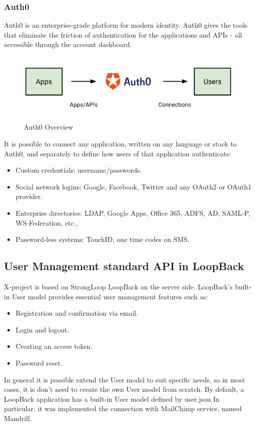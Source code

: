 \subsubsection{Auth0}

Auth0 is an enterprise-grade platform for modern identity.
Auth0 gives the tools that eliminate the friction of authentication for the applications and APIs - all accessible through the account dashboard.\cite{usr_auth0}

\begin {figure}[h]
\graphicspath{{images/chapter_USR/}}
\includegraphics[width=\textwidth]{auth0}
\caption{Auth0 Overview}
\end {figure}

It is possible to connect any application, written on any language or stack to Auth0, and separately to define how users of that application authenticate:

\begin{itemize}
\item Custom credentials: username/passwords.
\item Social network logins: Google, Facebook, Twitter and any OAuth2 or OAuth1 provider.
\item Enterprise directories: LDAP, Google Apps, Office 365, ADFS, AD, SAML-P, WS-Federation, etc.,
\item Password-less systems: TouchID, one time codes on SMS.
\end{itemize}


\subsection{User Management standard API in LoopBack}

X-project is based on StrongLoop LoopBack on the server side.
LoopBack's built-in User model provides essential user management features such as:
\begin{itemize}
\item Registration and confirmation via email.
\item Login and logout.
\item Creating an access token.
\item Password reset. 
\end{itemize}
In general it is possible extend the User model to suit specific needs, so in most cases, it is don't need to create the own User model from scratch.
By default, a LoopBack application has a built-in User model defined by user.json
In particular, it was implemented the connection with MailChimp service, named Mandrill.

